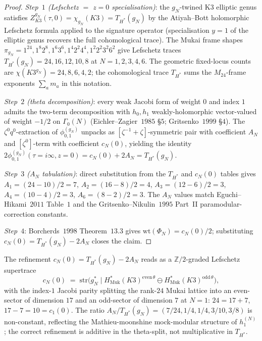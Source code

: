 \begin{proof}
\emph{Step~$1$ (Lefschetz $=$ $z = 0$ specialisation)}: the $g_N$-twined K3 elliptic genus satisfies $Z^{g_N}_{K3}(\tau, 0) = \chi_{g_N}(K3) = T_{H^*}(g_N)$ by the Atiyah--Bott holomorphic Lefschetz formula applied to the signature operator (specialisation $y = 1$ of the elliptic genus recovers the full cohomological trace). The Mukai frame shapes $\pi_{g_N} = 1^{24}, 1^8 2^8, 1^6 3^6, 1^4 2^2 4^4, 1^2 2^2 3^2 6^2$ give Lefschetz traces $T_{H^*}(g_N) = 24, 16, 12, 10, 8$ at $N = 1, 2, 3, 4, 6$. The geometric fixed-locus counts are $\chi(K3^{g_N}) = 24, 8, 6, 4, 2$; the cohomological trace $T_{H^*}$ sums the \(M_{24}\)-frame exponents \(\sum_a m_a\) in this notation.

\emph{Step~$2$ (theta decomposition)}: every weak Jacobi form of weight $0$ and index $1$ admits the two-term decomposition with $h_0, h_1$ weakly-holomorphic vector-valued of weight $-1/2$ on $\Gamma_0(N)$ (Eichler--Zagier~$1985$ \S$5$; Gritsenko~$1999$ \S$4$). The $\zeta^0 q^0$-extraction of $\phi^{(g_N)}_{0, 1}$ unpacks as $[\zeta^{-1} + \zeta]$-symmetric pair with coefficient $A_N$ and $[\zeta^0]$-term with coefficient $c_N(0)$, yielding the identity $2 \phi^{(g_N)}_{0, 1}(\tau = i\infty, z = 0) = c_N(0) + 2 A_N = T_{H^*}(g_N)$.

\emph{Step~$3$ ($A_N$ tabulation)}: direct substitution from the $T_{H^*}$ and $c_N(0)$ tables gives $A_1 = (24 - 10)/2 = 7$, $A_2 = (16 - 8)/2 = 4$, $A_3 = (12 - 6)/2 = 3$, $A_4 = (10 - 4)/2 = 3$, $A_6 = (8 - 2)/2 = 3$. The $A_N$ values match Eguchi--Hikami~$2011$ Table~$1$ and the Gritsenko--Nikulin~$1995$ Part~II paramodular-correction constants.

\emph{Step~$4$}: Borcherds~$1998$ Theorem~$13.3$ gives $\mathrm{wt}(\Phi_N) = c_N(0)/2$; substituting $c_N(0) = T_{H^*}(g_N) - 2 A_N$ closes the claim.
\end{proof}

\begin{remark}
\label{rem:k3e-jacobi-theta-supertrace}
The refinement $c_N(0) = T_{H^*}(g_N) - 2 A_N$ reads as a $\mathbb{Z}/2$-graded Lefschetz supertrace
\[
c_N(0) \;=\; \mathrm{str}\bigl(g_N^* \mid H^*_{\mathrm{Muk}}(K3)^{\mathrm{even}\,\theta} \ominus H^*_{\mathrm{Muk}}(K3)^{\mathrm{odd}\,\theta}\bigr),
\]
with the index-$1$ Jacobi parity splitting the rank-$24$ Mukai lattice into an even-sector of dimension $17$ and an odd-sector of dimension $7$ at $N = 1$: $24 = 17 + 7$, $17 - 7 = 10 = c_1(0)$. The ratio $A_N/T_{H^*}(g_N) = (7/24, 1/4, 1/4, 3/10, 3/8)$ is non-constant, reflecting the Mathieu-moonshine mock-modular structure of $h^{(N)}_1$; the correct refinement is additive in the theta-split, not multiplicative in $T_{H^*}$.
\end{remark}


